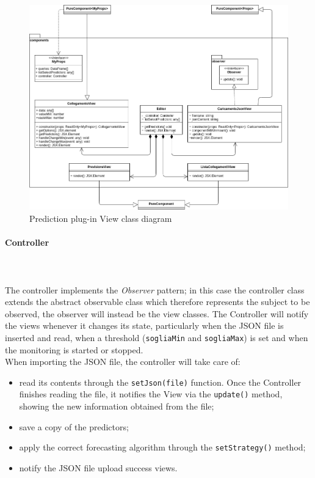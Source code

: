 \begin{figure}[H]
\centering
\includegraphics[scale=0.40]{../../../Diagrams/Classes_diagrams/plugin_view.png}
\caption{Prediction plug-in View class diagram}
\end{figure}

\paragraph{Controller}\mbox{} \\ \mbox{} \\
The controller implements the \textit{Observer} pattern; in this case the controller class extends the abstract observable class which therefore represents the subject to be observed, the observer will instead be the view classes.
The Controller will notify the views whenever it changes its state, particularly when the JSON file is inserted and read, when a threshold (\texttt{sogliaMin} and \texttt{sogliaMax}) is set and when the monitoring is started or stopped.\\
When importing the JSON file, the controller will take care of: \begin{itemize}
\item read its contents through the \texttt{setJson(file)} function. Once the Controller finishes reading the file, it notifies the View via the \texttt{update()} method, showing the new information obtained from the file;
\item save a copy of the predictors;
\item apply the correct forecasting algorithm through the \texttt{setStrategy()} method;
\item notify the JSON file upload success views.
\end{itemize}

